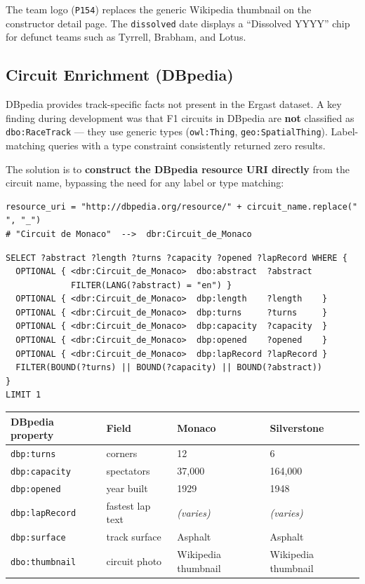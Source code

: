 \documentclass[12pt,a4paper]{article}
\begin{document}
The team logo (\texttt{P154}) replaces the generic Wikipedia thumbnail on the
constructor detail page. The \texttt{dissolved} date displays a ``Dissolved YYYY''
chip for defunct teams such as Tyrrell, Brabham, and Lotus.

\subsection{Circuit Enrichment (DBpedia)}

DBpedia provides track-specific facts not present in the Ergast dataset.
A key finding during development was that F1 circuits in DBpedia are \textbf{not}
classified as \texttt{dbo:RaceTrack} --- they use generic types (\texttt{owl:Thing},
\texttt{geo:SpatialThing}). Label-matching queries with a type constraint
consistently returned zero results.

The solution is to \textbf{construct the DBpedia resource URI directly} from the
circuit name, bypassing the need for any label or type matching:

\begin{lstlisting}[style=python, caption={Direct URI construction for DBpedia circuit lookup (external\_data.py)}]
resource_uri = "http://dbpedia.org/resource/" + circuit_name.replace(" ", "_")
# "Circuit de Monaco"  -->  dbr:Circuit_de_Monaco
\end{lstlisting}

\begin{lstlisting}[style=sparql, caption={DBpedia query using direct resource URI}]
SELECT ?abstract ?length ?turns ?capacity ?opened ?lapRecord WHERE {
  OPTIONAL { <dbr:Circuit_de_Monaco>  dbo:abstract  ?abstract
             FILTER(LANG(?abstract) = "en") }
  OPTIONAL { <dbr:Circuit_de_Monaco>  dbp:length    ?length    }
  OPTIONAL { <dbr:Circuit_de_Monaco>  dbp:turns     ?turns     }
  OPTIONAL { <dbr:Circuit_de_Monaco>  dbp:capacity  ?capacity  }
  OPTIONAL { <dbr:Circuit_de_Monaco>  dbp:opened    ?opened    }
  OPTIONAL { <dbr:Circuit_de_Monaco>  dbp:lapRecord ?lapRecord }
  FILTER(BOUND(?turns) || BOUND(?capacity) || BOUND(?abstract))
}
LIMIT 1
\end{lstlisting}

\begin{center}
\begin{tabular}{@{}llll@{}}
\toprule
\textbf{DBpedia property} & \textbf{Field} & \textbf{Monaco} & \textbf{Silverstone} \\
\midrule
\texttt{dbp:turns}     & corners          & 12       & 6 \\
\texttt{dbp:capacity}  & spectators       & 37{,}000 & 164{,}000 \\
\texttt{dbp:opened}    & year built       & 1929     & 1948 \\
\texttt{dbp:lapRecord} & fastest lap text & \textit{(varies)} & \textit{(varies)} \\
\texttt{dbp:surface}   & track surface    & Asphalt  & Asphalt \\
\texttt{dbo:thumbnail} & circuit photo    & Wikipedia thumbnail & Wikipedia thumbnail \\
\bottomrule
\end{tabular}
\end{center}
\end{document}
